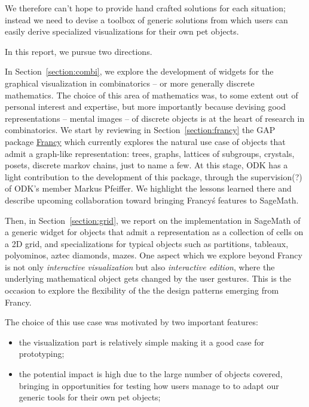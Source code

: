 \documentclass{deliverablereport}
\begin{document}
We therefore can't hope to provide hand crafted solutions for each
situation; instead we need to devise a toolbox of generic solutions
from which users can easily derive specialized visualizations for
their own pet objects.

In this report, we pursue two directions.

In Section~\ref{section:combi}, we explore the development of widgets
for the graphical visualization in combinatorics -- or more generally
discrete mathematics. The choice of this area of mathematics was, to
some extent out of personal interest and expertise, but more
importantly because devising good representations -- mental images --
of discrete objects is at the heart of research in combinatorics. We
start by reviewing in Section~\ref{section:francy} the GAP package
\href{https://github.com/mcmartins/francy}{Francy} which currently
explores the natural use case of objects that admit a graph-like
representation: trees, graphs, lattices of subgroups, crystals,
posets, discrete markov chains, just to name a few. At this stage, ODK
has a light contribution to the development of this package, through
the supervision(?) of ODK's member Markus Pfeiffer. We highlight the
lessons learned there and describe upcoming collaboration toward
bringing Francy\'s features to SageMath.

Then, in Section~\ref{section:grid}, we report on the implementation
in SageMath of a generic widget for objects that admit a
representation as a collection of cells on a 2D grid, and
specializations for typical objects such as partitions, tableaux,
polyominos, aztec diamonds, mazes. One aspect which we explore beyond
Francy is not only \emph{interactive visualization} but also
\emph{interactive edition}, where the underlying mathematical object
gets changed by the user gestures. This is the occasion to explore the
flexibility of the the design patterns emerging from Francy.

The choice of this use case was motivated by two important features:
\begin{itemize}
\item the visualization part is relatively simple making it a good
  case for prototyping;
\item the potential impact is high due to the large number of objects
  covered, bringing in opportunities for testing how users manage to
  to adapt our generic tools for their own pet objects;
\end{itemize}
\end{document}
